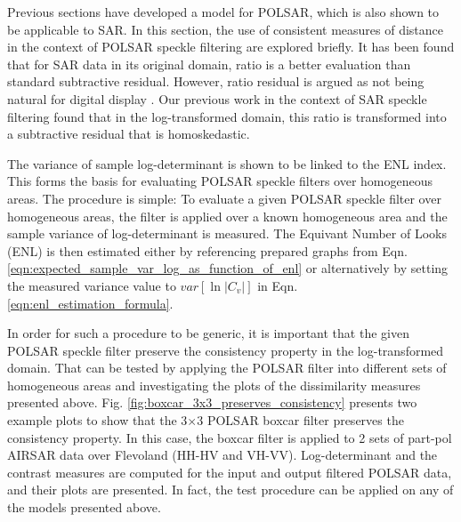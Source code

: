 \documentclass[journal]{IEEEtran}
\begin{document}
Previous sections have developed a model for POLSAR, which is also shown to be applicable to SAR.
In this section, the use of consistent measures of distance in the context of POLSAR speckle filtering are explored briefly.
It has been found \cite{Rignot_1993_TGRS_896} that for SAR data in its original domain,  
   ratio is a better evaluation than standard subtractive residual. 
However, ratio residual is argued as not being natural for digital display \cite{Medeiros_2003_IJRS}.
Our previous work in the context of SAR speckle filtering found that
  in the log-transformed domain, this ratio is transformed into a subtractive residual that is homoskedastic.
  
The variance of sample log-determinant is shown to be linked to the ENL index.
This forms the basis for evaluating POLSAR speckle filters over homogeneous areas.
The procedure is simple:
To evaluate a given POLSAR speckle filter over homogeneous areas,
  the filter is applied over a known homogeneous area and the sample variance of log-determinant is measured.
The Equivant Number of Looks (ENL) is then estimated
  either by referencing prepared graphs from Eqn. \ref{eqn:expected_sample_var_log_as_function_of_enl} 
  or alternatively by setting the measured variance value to $var[\ln{|C_v|}]$ in Eqn. \ref{eqn:enl_estimation_formula}.

In order for such a procedure to be generic,
  it is important that the given POLSAR speckle filter preserve the consistency property in the log-transformed domain.
That can be tested by applying the POLSAR filter into different sets of homogeneous areas and investigating the plots of the dissimilarity measures presented above.
Fig. \ref{fig:boxcar_3x3_preserves_consistency} presents two example plots to show that
  the 3$\times$3 POLSAR boxcar filter preserves the consistency property.
In this case, the boxcar filter is applied to 2 sets of part-pol AIRSAR data over Flevoland (HH-HV and VH-VV).
Log-determinant and the contrast measures are computed for the input and output filtered POLSAR data,
  and their plots are presented.
In fact, the test procedure can be applied on any of the models presented above.  
\end{document}
